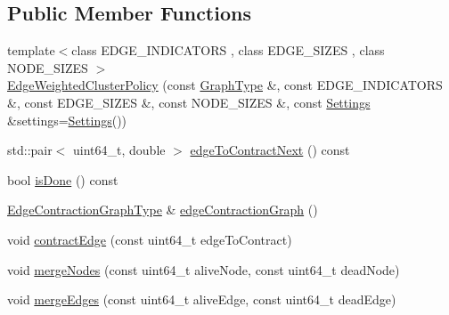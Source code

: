 \subsection*{Public Member Functions}
\begin{DoxyCompactItemize}
\item 
{\footnotesize template$<$class E\+D\+G\+E\+\_\+\+I\+N\+D\+I\+C\+A\+T\+O\+R\+S , class E\+D\+G\+E\+\_\+\+S\+I\+Z\+E\+S , class N\+O\+D\+E\+\_\+\+S\+I\+Z\+E\+S $>$ }\\\hyperlink{classnifty_1_1graph_1_1agglo_1_1EdgeWeightedClusterPolicy_ac72c096c7f63561e76908b4434a5e759}{Edge\+Weighted\+Cluster\+Policy} (const \hyperlink{classnifty_1_1graph_1_1agglo_1_1EdgeWeightedClusterPolicy_a8e910f7b9d0c1baa1de7b6b1c3e58397}{Graph\+Type} \&, const E\+D\+G\+E\+\_\+\+I\+N\+D\+I\+C\+A\+T\+O\+R\+S \&, const E\+D\+G\+E\+\_\+\+S\+I\+Z\+E\+S \&, const N\+O\+D\+E\+\_\+\+S\+I\+Z\+E\+S \&, const \hyperlink{classnifty_1_1graph_1_1agglo_1_1EdgeWeightedClusterPolicy_acb5f307af4f968aac09e0aa716df633a}{Settings} \&settings=\hyperlink{classnifty_1_1graph_1_1agglo_1_1EdgeWeightedClusterPolicy_acb5f307af4f968aac09e0aa716df633a}{Settings}())
\item 
std\+::pair$<$ uint64\+\_\+t, double $>$ \hyperlink{classnifty_1_1graph_1_1agglo_1_1EdgeWeightedClusterPolicy_a6ab0f6aa52808094a3cf375a5f6b085e}{edge\+To\+Contract\+Next} () const 
\item 
bool \hyperlink{classnifty_1_1graph_1_1agglo_1_1EdgeWeightedClusterPolicy_a46dcdcc192a1e07625a7c8c576dc5149}{is\+Done} () const 
\item 
\hyperlink{classnifty_1_1graph_1_1agglo_1_1EdgeWeightedClusterPolicy_af2c3024ed1be514c58004dfa7e77448b}{Edge\+Contraction\+Graph\+Type} \& \hyperlink{classnifty_1_1graph_1_1agglo_1_1EdgeWeightedClusterPolicy_ac66821b0db08e136631b0c75adf660d0}{edge\+Contraction\+Graph} ()
\item 
void \hyperlink{classnifty_1_1graph_1_1agglo_1_1EdgeWeightedClusterPolicy_ab17fb3b1739432d2263366d2a3f0800c}{contract\+Edge} (const uint64\+\_\+t edge\+To\+Contract)
\item 
void \hyperlink{classnifty_1_1graph_1_1agglo_1_1EdgeWeightedClusterPolicy_ab6176f00d96818257fdffdb7a363c5e1}{merge\+Nodes} (const uint64\+\_\+t alive\+Node, const uint64\+\_\+t dead\+Node)
\item 
void \hyperlink{classnifty_1_1graph_1_1agglo_1_1EdgeWeightedClusterPolicy_ad6e93f21537c3931da24765c689de3c1}{merge\+Edges} (const uint64\+\_\+t alive\+Edge, const uint64\+\_\+t dead\+Edge)
\item 

\end{DoxyCompactItemize}
